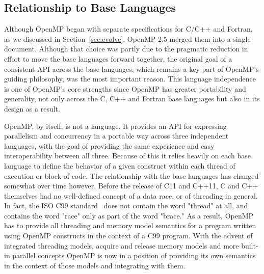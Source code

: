 \subsection{Relationship to Base Languages}
\label{sub:relationship_to_base_languages}

Although OpenMP began with separate specifications for C/C++ and 
Fortran, as we discussed in Section~\ref{sec:evolve}, OpenMP 2.5 
merged them into a single document. Although that choice was
partly due to the pragmatic reduction in effort to move the base 
languages forward together, the original goal of a consistent API 
across the base languages, which remains a key part of OpenMP's 
guiding philosophy, was the most important reason. This language 
independence is one of OpenMP's core strengths since OpenMP has 
greater portability and generality, not only across the C, C++ 
and Fortran base languages but also in its design as a result. 



OpenMP, by itself, is not a language.  It provides an API for expressing
parallelism and concurrency in a portable way across three independent
languages, with the goal of providing the same experience and easy
interoperability between all three.  Because of this it relies heavily on each
base language to define the behavior of a given construct within each thread of
execution or block of code.  The relationship with the base languages has
changed somewhat over time however.  Before the release of C11 and C++11, C and
C++ themselves had no well-defined concept of a data race, or of threading in
general.  In fact, the ISO C99 standard~\cite{c99} does not contain the word
"thread" at all, and contains the word "race" only as part of the word "brace."
As a result, OpenMP has to provide all threading and memory model semantics for
a program written using OpenMP constructs in the context of a C99 program.  With
the advent of integrated threading models, acquire and release memory models and
more built-in parallel concepts OpenMP is now in a position of providing its own
semantics in the context of those models and integrating with them.


